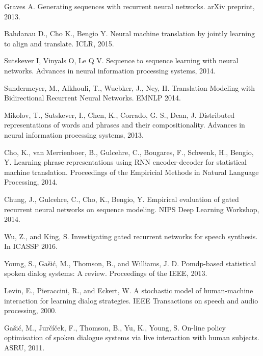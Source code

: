 \documentclass[paper=a4, fontsize=18pt]{article} %
\numberwithin{equation}{section} %
\numberwithin{figure}{section} %
\numberwithin{table}{section} %
\begin{document}

%
\begin{thebibliography}{10}

Graves A. Generating sequences with recurrent neural networks. arXiv preprint, 2013.

Bahdanau D., Cho K., Bengio Y. Neural machine translation by jointly learning to align and translate. ICLR, 2015.

Sutskever I, Vinyals O, Le Q V. Sequence to sequence learning with neural networks. Advances in neural information processing systems, 2014.

Sundermeyer, M., Alkhouli, T., Wuebker, J., Ney, H. Translation Modeling with Bidirectional Recurrent Neural Networks. EMNLP 2014.

Mikolov, T., Sutskever, I., Chen, K., Corrado, G. S., Dean, J. Distributed representations of words and phrases and their compositionality. Advances in neural information processing systems, 2013.

Cho, K., van Merrienboer, B., Gulcehre, C., Bougares, F., Schwenk, H., Bengio, Y.
Learning phrase representations using RNN encoder-decoder for statistical machine translation. Proceedings of the Empiricial Methods in Natural Language Processing, 2014.

Chung, J., Gulcehre, C., Cho, K., Bengio, Y. Empirical evaluation of gated recurrent neural networks on sequence modeling. NIPS Deep Learning Workshop, 2014.

Wu, Z., and King, S. Investigating gated recurrent networks for speech synthesis. In ICASSP 2016.

Young, S., Gašić, M., Thomson, B., and Williams, J. D. Pomdp-based statistical spoken dialog systems: A review. Proceedings of the IEEE, 2013.

Levin, E., Pieraccini, R., and Eckert, W. A stochastic model of human-machine interaction for learning dialog strategies. IEEE Transactions on speech and audio processing, 2000.

Gašić, M., Jurčíček, F., Thomson, B., Yu, K., Young, S. On-line policy optimisation of spoken dialogue systems via live interaction with human subjects. ASRU, 2011.


\end{thebibliography}
\end{document}
